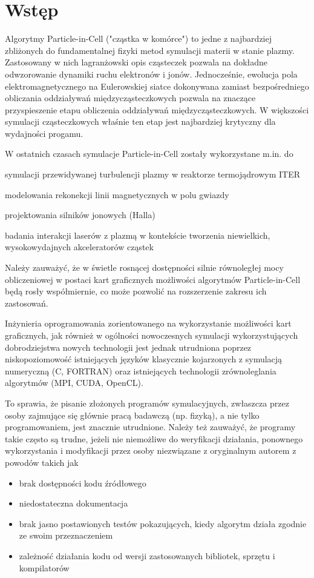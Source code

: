 \newcommand{\code}[1]{\texttt{#1}}

\section[Wstęp]{Wstęp} %
Algorytmy Particle-in-Cell ("cząstka w komórce") to jedne z najbardziej zbliżonych do fundamentalnej fizyki
metod symulacji materii w stanie plazmy. Zastosowany w nich lagranżowski opis cząsteczek pozwala na dokładne
odwzorowanie dynamiki ruchu elektronów i jonów. Jednocześnie, ewolucja pola elektromagnetycznego na Eulerowskiej
siatce dokonywana zamiast bezpośredniego obliczania oddziaływań międzycząsteczkowych pozwala na znaczące
przyspieszenie etapu obliczenia oddziaływań międzycząsteczkowych. W większości symulacji cząsteczkowych właśnie
ten etap jest najbardziej krytyczny dla wydajności progamu.

W ostatnich czasach symulacje Particle-in-Cell zostały wykorzystane m.in. do
\item symulacji przewidywanej turbulencji plazmy w reaktorze termojądrowym ITER %
\item modelowania rekonekcji linii magnetycznych w polu gwiazdy %
\item projektowania silników jonowych (Halla) %
\item badania interakcji laserów z plazmą w kontekście tworzenia niewielkich,
    wysokowydajnych akceleratorów cząstek %

    Należy zauważyć, że w świetle rosnącej dostępności silnie równoległej mocy obliczeniowej w postaci kart graficznych
    możliwości algorytmów Particle-in-Cell będą rosły współmiernie, co może pozwolić na rozszerzenie zakresu ich zastosowań.

    Inżynieria oprogramowania zorientowanego na wykorzystanie możliwości kart graficznych,
    jak również w ogólności nowoczesnych symulacji wykorzystujących dobrodziejstwa nowych technologii
    jest jednak utrudniona poprzez niskopoziomowość istniejących języków klasycznie
    kojarzonych z symulacją numeryczną (C, FORTRAN) oraz istniejących technologii zrównoleglania
    algorytmów (MPI, CUDA, OpenCL).

    To sprawia, że pisanie złożonych programów symulacyjnych, zwłaszcza przez osoby
    zajmujące się głównie pracą badawczą (np. fizyką), a nie tylko programowaniem,
    jest znacznie utrudnione. Należy też zauważyć, że programy takie często są
    trudne, jeżeli nie niemożliwe do weryfikacji działania, ponownego wykorzystania
    i modyfikacji przez osoby niezwiązane z oryginalnym autorem z powodów takich jak
    \begin{itemize}
        \item brak dostępności kodu źródłowego
        \item niedostateczna dokumentacja
        \item brak jasno postawionych testów pokazujących, kiedy algorytm działa zgodnie ze swoim przeznaczeniem
        \item zależność działania kodu od wersji zastosowanych bibliotek, sprzętu i kompilatorów
    \end{itemize}

